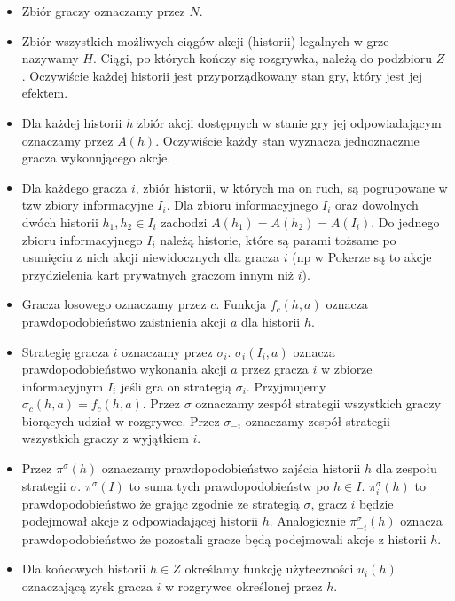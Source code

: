 \documentclass[licencjacka]{pracamgr}
\begin{document}
\begin{itemize}

\item Zbiór graczy oznaczamy przez $N$.
\item Zbiór wszystkich możliwych ciągów akcji (historii) legalnych w grze nazywamy $H$. Ciągi, po których kończy
      się rozgrywka, należą do podzbioru $Z$. Oczywiście każdej historii jest przyporządkowany stan gry, który
      jest jej efektem.
\item Dla każdej historii $h$ zbiór akcji dostępnych w stanie gry jej odpowiadającym oznaczamy przez $A(h)$. Oczywiście
      każdy stan wyznacza jednoznacznie gracza wykonującego akcje.
\item Dla każdego gracza $i$, zbiór historii, w których ma on ruch, są pogrupowane w tzw zbiory informacyjne $I_i$. Dla zbioru
      informacyjnego $I_i$ oraz dowolnych dwóch historii $h_1, h_2 \in I_i$ zachodzi $A(h_1) = A(h_2) = A(I_i)$. Do jednego
      zbioru informacyjnego $I_i$ należą historie, które są parami tożsame po usunięciu z nich akcji niewidocznych dla gracza $i$
      (np w Pokerze są to akcje przydzielenia kart prywatnych graczom innym niż $i$).
\item Gracza losowego oznaczamy przez $c$. Funkcja $f_c(h, a)$ oznacza prawdopodobieństwo zaistnienia akcji $a$ dla historii $h$.
\item Strategię gracza $i$ oznaczamy przez $\sigma_i$. $\sigma_i(I_i, a)$ oznacza prawdopodobieństwo wykonania akcji $a$ przez
      gracza $i$ w zbiorze informacyjnym $I_i$ jeśli gra on strategią $\sigma_i$. Przyjmujemy $\sigma_c(h, a) = f_c(h, a)$.
      Przez $\sigma$ oznaczamy zespół strategii wszystkich graczy biorących udział w rozgrywce. Przez $\sigma_{-i}$ oznaczamy
      zespół strategii wszystkich graczy z wyjątkiem $i$.
\item Przez $\pi^{\sigma}(h)$ oznaczamy prawdopodobieństwo zajścia historii $h$ dla zespołu strategii $\sigma$.
      $\pi^{\sigma}(I)$ to suma tych prawdopodobieństw po $h \in I$. $\pi_i^{\sigma}(h)$ to prawdopodobieństwo że grając
      zgodnie ze strategią $\sigma$, gracz $i$ będzie podejmował akcje z odpowiadającej historii $h$. Analogicznie
      $\pi_{-i}^{\sigma}(h)$ oznacza prawdopodobieństwo że pozostali gracze będą podejmowali akcje z historii $h$.
\item Dla końcowych historii $h \in Z$ określamy funkcję użyteczności $u_i(h)$ oznaczającą zysk gracza $i$ w rozgrywce
      określonej przez $h$.

\end{itemize}
\end{document}
